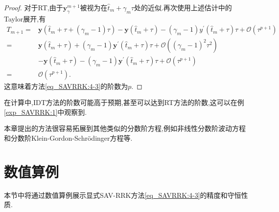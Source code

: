 \begin{proof}
对于RT,由于$\bm{y}_\gamma^{m+1}$被视为在$\hat{t}_m+\gamma_m \tau$处的近似.再次使用上述估计中的Taylor展开,有
\begin{align}
T_{m+1}\!= & \bm{y}\left(\hat{t}_m\!+\!\tau\!+\!\left(\gamma_m\!-\!1\right) \tau\right)\!-\!\bm{y}\left(\hat{t}_m\!+\!\tau\right)\!-\!\left(\gamma_m\!-\!1\right) y^{\prime}\left(\hat{t}_m\!+\!\tau\right) \tau\!+\!\mathcal{O}(\tau^{p+1}) \nonumber\\
\!= & \bm{y}\left(\hat{t}_m\!+\!\tau\right)\!+\!\left(\gamma_m\!-\!1\right) \bm{y}^{\prime}\left(\hat{t}_m\!+\!\tau\right) \tau\!+\!\mathcal{O}(\left(\gamma_m\!-\!1\right)^2 \tau^2)\!\nonumber\\
&-\!\bm{y}\left(\hat{t}_m\!+\!\tau\right)\!-\!\left(\gamma_m\!-\!1\right) \bm{y}^{\prime}\left(\hat{t}_m\!+\!\tau\right) \tau\!+\!\mathcal{O}(\tau^{p+1}) \nonumber\\
\!= & \mathcal{O}(\tau^{p+1}).
\end{align}
这意味着方法\eqref{eq_SAVRRK:4-3}的阶数为$p$.
\end{proof}

\begin{remark}\label{rk_SAVRRK:5_5}
在计算中,IDT方法的阶数可能高于预期,甚至可以达到RT方法的阶数,这可以在例\ref{exp_SAVRRK:1}中观察到.
\end{remark}
	
\begin{remark}\label{rk_SAVRRK:5_6}
本章提出的方法很容易拓展到其他类似的分数阶方程,例如非线性分数阶波动方程和分数阶Klein-Gordon-Schr{\"o}dinger方程等.
\end{remark}

\section{数值算例}\label{Section_SAVRRK: 6}

本节中将通过数值算例展示显式SAV-RRK方法\eqref{eq_SAVRRK:4-3}的精度和守恒性质.

